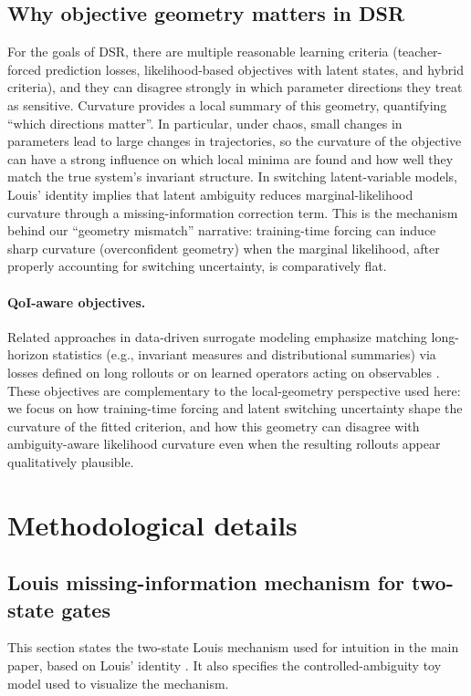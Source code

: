 \documentclass[twoside]{article}
\theoremstyle{plain}
\theoremstyle{definition}
\theoremstyle{remark}
\begin{document}
\subsection{Why objective geometry matters in DSR}
For the goals of DSR,
there are multiple reasonable learning criteria (teacher-forced prediction losses, likelihood-based objectives with latent states, and hybrid criteria), and they can disagree strongly in which parameter directions they treat as sensitive. Curvature provides a local summary of this geometry, quantifying ``which directions matter''. In particular, under chaos, small changes in parameters lead to large changes in trajectories, so the curvature of the objective can have a strong influence on which local minima are found and how well they match the true system's invariant structure. In switching latent-variable models, Louis' identity implies that latent ambiguity reduces marginal-likelihood curvature through a missing-information correction term. This is the mechanism behind our ``geometry mismatch'' narrative: training-time forcing can induce sharp curvature (overconfident geometry) when the marginal likelihood, after properly accounting for switching uncertainty, is comparatively flat.

\paragraph{QoI-aware objectives.}
Related approaches in data-driven surrogate modeling emphasize matching long-horizon statistics (e.g., invariant measures and distributional summaries) via losses defined on long rollouts or on learned operators acting on observables \citep{schiff2024dyslim,cheng2025learningcl}. These objectives are complementary to the local-geometry perspective used here: we focus on how training-time forcing and latent switching uncertainty shape the curvature of the fitted criterion, and how this geometry can disagree with ambiguity-aware likelihood curvature even when the resulting rollouts appear qualitatively plausible.

\section{Methodological details}
\label{sec:s:method_details}

\subsection{Louis missing-information mechanism for two-state gates}
\label{sec:s:louis_toy}
This section states the two-state Louis mechanism used for intuition in the main paper, based on Louis' identity \citep{louis1982,dempster1977em}. It also specifies the controlled-ambiguity toy model used to visualize the mechanism.
\end{document}
